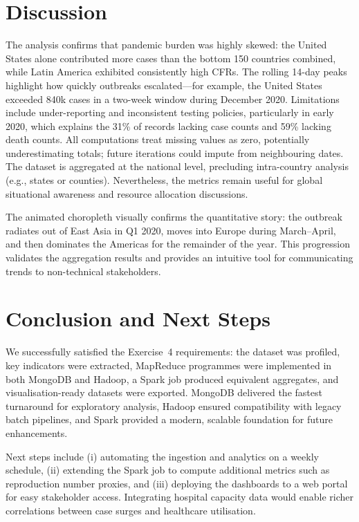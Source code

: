 \documentclass[12pt, a4paper]{article}
\begin{document}
\section{Discussion}
The analysis confirms that pandemic burden was highly skewed: the United States alone contributed more cases than the bottom 150 countries combined, while Latin America exhibited consistently high CFRs. The rolling 14-day peaks highlight how quickly outbreaks escalated---for example, the United States exceeded 840k cases in a two-week window during December 2020. Limitations include under-reporting and inconsistent testing policies, particularly in early 2020, which explains the 31\% of records lacking case counts and 59\% lacking death counts. All computations treat missing values as zero, potentially underestimating totals; future iterations could impute from neighbouring dates. The dataset is aggregated at the national level, precluding intra-country analysis (e.g., states or counties). Nevertheless, the metrics remain useful for global situational awareness and resource allocation discussions.

The animated choropleth visually confirms the quantitative story: the outbreak radiates out of East Asia in Q1 2020, moves into Europe during March--April, and then dominates the Americas for the remainder of the year. This progression validates the aggregation results and provides an intuitive tool for communicating trends to non-technical stakeholders.

\section{Conclusion and Next Steps}
We successfully satisfied the Exercise~4 requirements: the dataset was profiled, key indicators were extracted, MapReduce programmes were implemented in both MongoDB and Hadoop, a Spark job produced equivalent aggregates, and visualisation-ready datasets were exported. MongoDB delivered the fastest turnaround for exploratory analysis, Hadoop ensured compatibility with legacy batch pipelines, and Spark provided a modern, scalable foundation for future enhancements.

Next steps include (i) automating the ingestion and analytics on a weekly schedule, (ii) extending the Spark job to compute additional metrics such as reproduction number proxies, and (iii) deploying the dashboards to a web portal for easy stakeholder access. Integrating hospital capacity data would enable richer correlations between case surges and healthcare utilisation.
\end{document}
